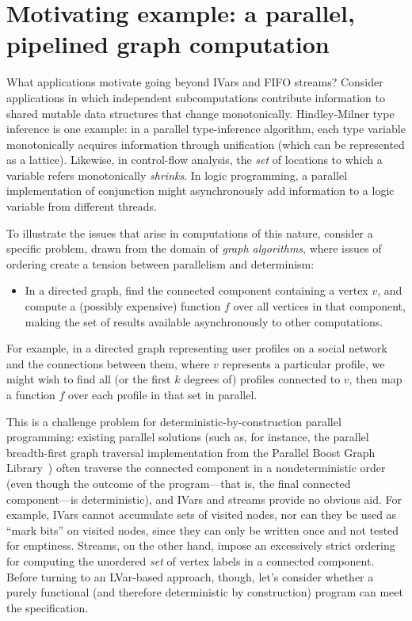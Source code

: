\section{Motivating example: a parallel, pipelined graph computation}\label{s:lvars-motivation}

What applications motivate going beyond IVars and FIFO streams?
Consider applications in which independent subcomputations contribute
information to shared mutable data structures that change
monotonically.  Hindley-Milner type inference is one example: in a
parallel type-inference algorithm, each type variable monotonically
acquires information through unification (which can be represented as
a lattice). Likewise, in control-flow analysis, the \emph{set} of
locations to which a variable refers monotonically \emph{shrinks}.  In
logic programming, a parallel implementation of conjunction might
asynchronously add information to a logic variable from different
threads.

To illustrate the issues that arise in computations of this nature,
consider a specific problem, drawn from the domain of \emph{graph
  algorithms}, where issues of ordering create a tension between
parallelism and determinism:
\begin{itemize}
\item 
  In a directed graph, find the connected component containing a
  vertex $v$, and compute a (possibly expensive) function $f$ over all
  vertices in that component, making the set of results available
  asynchronously to other computations.
\end{itemize}
For example, in a directed graph representing user profiles on a
social network and the connections between them, where $v$ represents
a particular profile, we might wish to find all (or the first $k$
degrees of) profiles connected to $v$, then map a function $f$ over
each profile in that set in parallel.

This is a challenge problem for deterministic-by-construction parallel
programming: existing parallel solutions (such as, for instance, the
parallel breadth-first graph traversal implementation from the
Parallel Boost Graph Library~\cite{bfs-pbgl}) often traverse the
connected component in a nondeterministic order (even though the
outcome of the program---that is, the final connected component---is
deterministic), and IVars and streams provide no obvious aid.  For
example, IVars cannot accumulate sets of visited nodes, nor can they
be used as ``mark bits'' on visited nodes, since they can only be
written once and not tested for emptiness.  Streams, on the other
hand, impose an excessively strict ordering for computing the
unordered \emph{set} of vertex labels in a connected component.
Before turning to an LVar-based approach, though, let's consider
whether a purely functional (and therefore deterministic by
construction) program can meet the specification.

